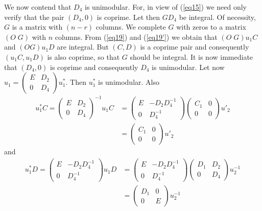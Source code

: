 We now contend that $D_4$ is unimodular.  For, in view of (\ref{eq15}) we
need only verify that the pair $(D_4, 0)$ is coprime. Let then $GD_4$
be integral. Of necessity, $G$ is a matrix with $(n-r)$ columns. We
complete $G$ with zeros to a matrix $(O \;  G)$ with $n$ columns. From
(\ref{eq19}) and (\ref{eq19'}) we obtain that $(O \;  G)u_1 C $ and
$(O   G)u_1 D$ 
are integral. But $(C, D)$ is a coprime pair and consequently $(u_1 C,
u_1 D)$ is also coprime, so that $G$ should be integral. It is now
immediate that $(D_4, 0)$ is coprime and consequently $D_4$ is
unimodular. Let now $u_1 = \begin{pmatrix} E & D_2 \\ 0 &
  D_4 \end{pmatrix}u^*_1$. Then $u^*_1$ is unimodular. Also 
\begin{align*}
u^*_1 C = \begin{pmatrix}E & D_2 \\ 0 & D_4\end{pmatrix}^{-1}   u_1 C
  & = \begin{pmatrix}E & -D_2D^{-1}_4 \\ 0 &
    D^{-1}_4 \end{pmatrix} \begin{pmatrix}C_1 & 0 \\ 0 &
    0 \end{pmatrix} u'_2\\ 
& = \begin{pmatrix} C_1 & 0 \\ 0 & 0\end{pmatrix} u'_2
\end{align*}
and 
\begin{align*}
u^*_1 D = \begin{pmatrix}E & -D_2D^{-1}_4 \\ 0 &
  D^{-1}_4 \end{pmatrix} u_1 D & = \begin{pmatrix}E & -D_2D^{-1}_4
  \\ 0 & D^{-1}_4 \end{pmatrix} \begin{pmatrix} D_1 & D_2 \\ 0 &
  D_4\end{pmatrix} u^{-1}_2\\ 
& = \begin{pmatrix} D_1 & 0 \\ 0 & E\end{pmatrix} u^{-1}_2
\end{align*}

